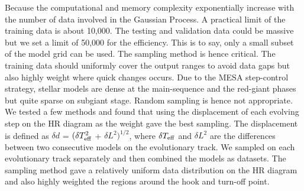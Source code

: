 Because the computational and memory complexity exponentially increase with the number of data involved in the Gaussian Process. A practical limit of the training data is about 10,000. The testing and validation data could be massive but we set a limit of 50,000 for the efficiency.  This is to say, only a small subset of the model grid can be used. The sampling method is hence critical. The training data should uniformly cover the output ranges to avoid data gaps but also highly weight where quick changes occurs. %
 Due to the \textsc{MESA} step-control strategy, stellar models are dense at the main-sequence and the red-giant phases but quite sparse on subgiant stage. Random sampling is hence not appropriate. We tested a few methods and found that using the displacement of each evolving step on the HR diagram as the weight gave the best sampling. The displacement is defined as $\delta d$ = $(\delta T_{\rm eff}^{2}$ + $\delta L^{2})^{1/2}$, where $\delta T_{\rm eff}$ and $\delta L^{2}$ are the differences between two consecutive models on the evolutionary track. We sampled on each evolutionary track separately and then combined the models as datasets. The sampling method gave a relatively uniform data distribution on the HR diagram and also highly weighted the regions around the hook and turn-off point.   
%
%
% 
